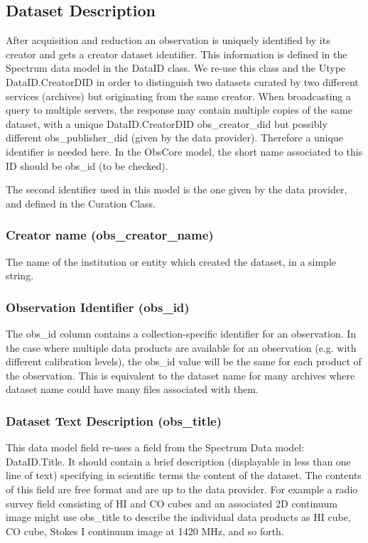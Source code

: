 \documentclass[11pt,a4paper]{ivoa}
\begin{document}
\subsection{Dataset Description}
After acquisition and reduction an observation is uniquely identified by its creator and gets a creator dataset
identifier.  This information is defined in the Spectrum data model in the DataID class. We re-use this class and the
Utype DataID.CreatorDID in order to distinguish two datasets curated by two different services (archives) but
originating from the same creator.  When broadcasting a query to multiple servers, the response may contain multiple
copies of the same dataset, with a unique DataID.CreatorDID obs\_creator\_did but possibly different
obs\_publisher\_did (given by the data provider). Therefore a unique identifier is needed here.  In the ObsCore model,
the short name associated to this ID should be obs\_id (to be checked).

The second identifier used in this model is the one given by the data provider, and defined in the Curation Class.

\subsubsection{Creator name (obs\_creator\_name)}
The name of the institution or entity which created the dataset, in a simple string.

\subsubsection{Observation Identifier (obs\_id)}
The obs\_id column contains a collection-specific identifier for an observation. In the case where multiple data
products are available for an observation (e.g. with different calibration levels), the obs\_id value will be the same
for each product of the observation. This is equivalent to the dataset name for many archives where dataset name could
have many files associated with them.

\subsubsection{Dataset Text Description (obs\_title)}
\label{bkm:Ref292046860}This data model field re-uses a field from the Spectrum Data model: DataID.Title. It should
contain a brief description (displayable in less than one line of text) specifying in scientific terms the content of
the dataset.  The contents of this field are free format and are up to the data provider.  For example a radio survey
field consisting of HI and CO cubes and an associated 2D continuum image might use obs\_title to describe the
individual data products as {\textquotedbl}HI cube{\textquotedbl}, {\textquotedbl}CO cube{\textquotedbl},
{\textquotedbl}Stokes I continuum image at 1420 MHz{\textquotedbl}, and so forth.
\end{document}
